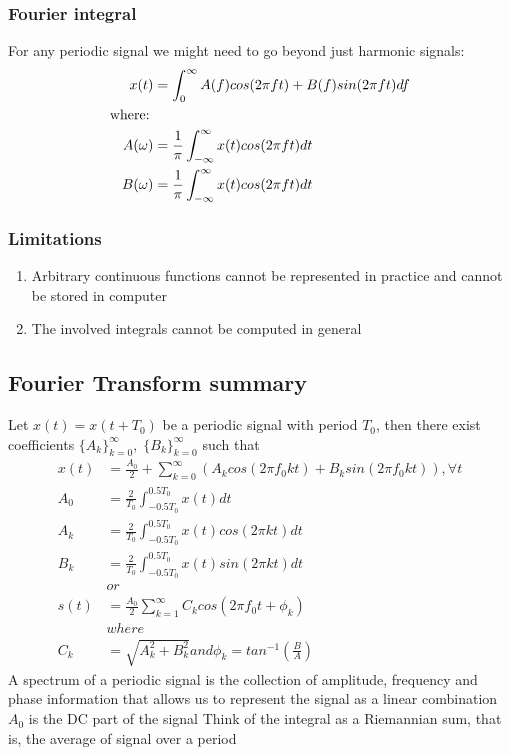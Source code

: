 \documentclass{article}
\begin{document}
    \subsubsection{Fourier integral}
    For any periodic signal we might need to go beyond just harmonic signals:
    \begin{align}
        x(t) &= \int_{0}^{\infty} A(f)cos(2\pi ft) + B(f)sin(2\pi ft)df\\
        \text{where:\;}\nonumber\\
        A(\omega) &= \frac{1}{\pi} \int_{-\infty}^{\infty} x(t)cos(2\pi ft)dt\\
        B(\omega) &= \frac{1}{\pi} \int_{-\infty}^{\infty} x(t)cos(2\pi ft)dt
    \end{align}
    \subsubsection{Limitations}
    \begin{enumerate}
        \item Arbitrary continuous functions cannot be represented in practice and cannot be stored in computer
        \item The involved integrals cannot be computed in general
    \end{enumerate}
    \subsection{Fourier Transform summary}
    Let $x(t) = x(t + T_0)$ be a periodic signal with period $T_0$, then there exist coefficients $\{A_k\}_{k = 0}^{\infty},\; \{B_k\}_{k = 0}^{\infty}$ such that
    \begin{align}
        x(t) &= \frac{A_0}{2} + \sum_{k=0}^{\infty}\left( A_k cos(2 \pi f_0 k t) + B_k sin(2 \pi f_0 k t)\right), \forall t\\
        A_0 &= \frac{2}{T_0} \int_{-0.5T_0}^{0.5T_0} x(t)dt\\
        A_k &= \frac{2}{T_0} \int_{-0.5T_0}^{0.5T_0} x(t)cos(2\pi kt)dt\\
        B_k &= \frac{2}{T_0} \int_{-0.5T_0}^{0.5T_0} x(t)sin(2\pi kt)dt\\
        &or \nonumber\\
        s(t) &= \frac{A_0}{2} \sum_{k=1}^{\infty} C_k cos(2 \pi f_0t + \phi_k)\\
        &where \nonumber\\
        C_k &= \sqrt{A_k^2 + B_k^2} and \phi_k = tan^{-1}(\frac{B}{A})
    \end{align}
    A spectrum of a periodic signal is the collection of amplitude, 
    frequency and phase information that allows us to represent the signal as a linear combination
    $A_0$ is the DC part of the signal
    Think of the integral as a Riemannian sum, that is, 
    the average of signal over a period
\end{document}
